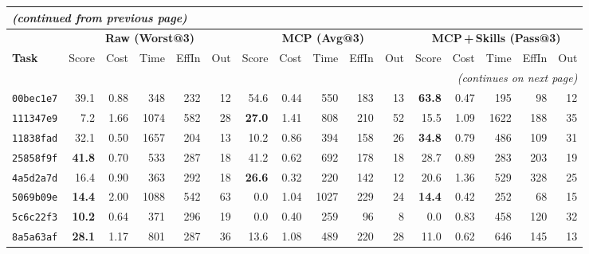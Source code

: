 \documentclass[10pt]{article}
\begin{document}
\begin{longtable}{@{}
    l
    | r r r r r
    | r r r r r
    | r r r r r
  @{}}
\multicolumn{16}{l}{\footnotesize\itshape (continued from previous page)}\\[2pt]
\toprule
& \multicolumn{5}{c|}{\cellcolor{rawbg}\textbf{Raw (Worst@3)}}
& \multicolumn{5}{c|}{\cellcolor{mcpbg}\textbf{MCP (Avg@3)}}
& \multicolumn{5}{c}{\cellcolor{skillsbg}\textbf{MCP\,+\,Skills (Pass@3)}} \\
\cmidrule(lr){2-6}\cmidrule(lr){7-11}\cmidrule(lr){12-16}
\textbf{Task}
  & Score & Cost & Time & EffIn & Out
  & Score & Cost & Time & EffIn & Out
  & Score & Cost & Time & EffIn & Out \\
\midrule
\endhead

\midrule
\multicolumn{16}{r}{\footnotesize\itshape (continues on next page)}\\
\endfoot

\bottomrule
\endlastfoot

\texttt{00bec1e7}
  & 39.1 & 0.88 & 348  & 232 &  12
  & 54.6 & 0.44 & 550  & 183 &  13
  & \textbf{63.8} & 0.47 & 195 &  98 &  12 \\

\texttt{111347e9}
  &  7.2 & 1.66 & 1074 & 582 &  28
  & \textbf{27.0} & 1.41 & 808  & 210 &  52
  & 15.5 & 1.09 & 1622 & 188 &  35 \\

\texttt{11838fad}
  & 32.1 & 0.50 & 1657 & 204 &  13
  & 10.2 & 0.86 & 394  & 158 &  26
  & \textbf{34.8} & 0.79 & 486  & 109 &  31 \\

\texttt{25858f9f}
  & \textbf{41.8} & 0.70 & 533  & 287 &  18
  & 41.2 & 0.62 & 692  & 178 &  18
  & 28.7 & 0.89 & 283  & 203 &  19 \\

\texttt{4a5d2a7d}
  & 16.4 & 0.90 & 363  & 292 &  18
  & \textbf{26.6} & 0.32 & 220  & 142 &  12
  & 20.6 & 1.36 & 529  & 328 &  25 \\

\texttt{5069b09e}
  & \textbf{14.4} & 2.00 & 1088 & 542 &  63
  &  0.0 & 1.04 & 1027 & 229 &  24
  & \textbf{14.4} & 0.42 & 252  &  68 &  15 \\  %

\texttt{5c6c22f3}
  & \textbf{10.2} & 0.64 & 371  & 296 &  19
  &  0.0 & 0.40 & 259  &  96 &   8
  &  0.0 & 0.83 & 458  & 120 &  32 \\

\texttt{8a5a63af}
  & \textbf{28.1} & 1.17 & 801  & 287 &  36
  & 13.6 & 1.08 & 489  & 220 &  28
  & 11.0 & 0.62 & 646  & 145 &  13 \\


\end{longtable}
\end{document}
